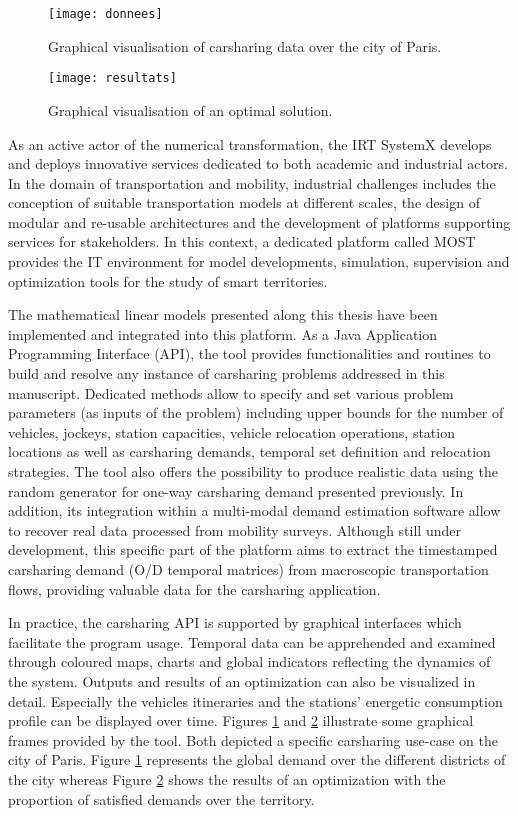 \begin{figure}[t]
\texttt{[image: donnees]}
\caption{Graphical visualisation of carsharing data over the city of Paris.}
\label{fig:donnees}
\end{figure}

\begin{figure}[t]
\texttt{[image: resultats]}
\caption{Graphical visualisation of an optimal solution.}
\label{fig:resultats}
\end{figure}

As an active actor of the numerical transformation, the IRT SystemX develops and deploys innovative services dedicated to both academic and industrial actors.
In the domain of transportation and mobility, industrial challenges includes the conception of suitable transportation models at different scales, the design of modular and re-usable architectures and the development of platforms supporting services for stakeholders.
In this context, a dedicated platform called MOST provides the IT environment for model developments, simulation, supervision and optimization tools for the study of smart territories.

\medskip
The mathematical linear models presented along this thesis have been implemented and integrated into this platform.
As a Java Application Programming Interface (API), the tool provides functionalities and routines to build and resolve any instance of carsharing problems addressed in this manuscript.
Dedicated methods allow to specify and set various problem parameters (as inputs of the problem) including upper bounds for the number of vehicles, jockeys, station capacities, vehicle relocation operations, station locations as well as carsharing demands, temporal set definition and relocation strategies.
The tool also offers the possibility to produce realistic data using the random generator for one-way carsharing demand presented previously.
In addition, its integration within a multi-modal demand estimation software allow to recover real data processed from mobility surveys.
Although still under development, this specific part of the platform aims to extract the timestamped carsharing demand (O/D temporal matrices) from macroscopic transportation flows, providing valuable data for the carsharing application.

\medskip
In practice, the carsharing API is supported by graphical interfaces which facilitate the program usage.
Temporal data can be apprehended and examined through coloured maps, charts and global indicators reflecting the dynamics of the system.
Outputs and results of an optimization can also be visualized in detail.
Especially the vehicles itineraries and the stations' energetic consumption profile can be displayed over time.
Figures \ref{fig:donnees} and \ref{fig:resultats} illustrate some graphical frames provided by the tool.
Both depicted a specific carsharing use-case on the city of Paris.
Figure \ref{fig:donnees} represents the global demand over the different districts of the city whereas Figure \ref{fig:resultats} shows the results of an optimization with the proportion of satisfied demands over the territory.



